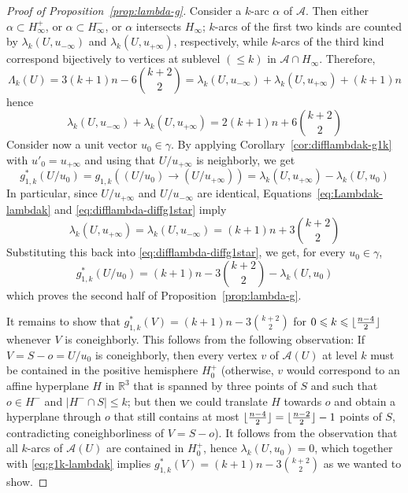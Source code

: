 \documentclass[a4paper,USenglish,cleveref, autoref, thm-restate,nolineno]{socg-lipics-v2021}
\renewcommand{\leq}{\leqslant}
\newcommand{\R}{\mathbb{R}}
\DeclarePairedDelimiter\floor{\lfloor}{\rfloor}
\begin{document}
\begin{proof}[Proof of Proposition~\ref{prop:lambda-g}]
Consider a $k$-arc $\alpha$ of $\mathcal{A}$. Then either $\alpha \subset H^+_{\infty}$, or $\alpha \subset H^-_{\infty}$, or $\alpha$ intersects $H_\infty$; $k$-arcs of the first two kinds are counted by $\lambda_k(U,u_{-\infty})$ and $\lambda_k(U,u_{+\infty})$, respectively, while $k$-arcs of the third kind correspond bijectively to vertices at sublevel $(\leq k)$ in $\mathcal{A}\cap H_{\infty}$. Therefore,
\[
\Lambda_k(U)=3(k+1)n-6\binom{k+2}{2}=\lambda_k(U,u_{-\infty}) + \lambda_k(U,u_{+\infty}) +(k+1)n
\]
hence
\begin{equation}
\label{eq:Lambdak-lambdak}
\lambda_k(U,u_{-\infty}) + \lambda_k(U,u_{+\infty}) = 2(k+1)n + 6\binom{k+2}{2}
\end{equation}
Consider now a unit vector $u_0 \in \gamma$. By applying Corollary~\ref{cor:difflambdak-g1k} with $u'_0 =u_{+\infty}$ and using that $U/u_{+\infty}$ is neighborly, we get
\begin{equation}
\label{eq:difflambda-diffg1star}
g^*_{1,k}(U/u_0) = g_{1,k}((U/u_0) \to (U/u_{+\infty}))
= \lambda_k(U,u_{+\infty}) - \lambda_k(U,u_0)
\end{equation}
In particular, since $U/u_{+\infty}$ and $U/u_{-\infty}$ are identical, Equations~\eqref{eq:Lambdak-lambdak} and \eqref{eq:difflambda-diffg1star}  imply
\begin{equation}
\label{eq:lambdapminfty}
\lambda_k(U,u_{+\infty}) = \lambda_k(U,u_{-\infty}) = (k+1)n + 3\binom{k+2}{2}
\end{equation}
Substituting this back into \eqref{eq:difflambda-diffg1star}, we get, for every $u_0\in \gamma$,
\begin{equation}
\label{eq:g1k-lambdak}
g^*_{1,k}(U/u_0) = (k+1)n-3\binom{k+2}{2} - \lambda_k(U,u_0)
\end{equation}
which proves the second half of Proposition~\ref{prop:lambda-g}.

It remains to show that $g^*_{1,k}(V)= (k+1)n-3\binom{k+2}{2}$ for $0\leq k\leq \floor{\frac{n-4}{2}}$ whenever $V$ is coneighborly. This follows from the following observation: If  $V=S-o=U/u_0$ is coneighborly, then every vertex $v$ of $\mathcal{A}(U)$ at level $k$ must be contained in the positive hemisphere $H_0^+$ (otherwise, $v$ would correspond to an affine hyperplane $H$ in $\R^3$ that is spanned by three points of $S$ and such that $o\in H^-$ and $|H^-\cap S|\leq k$; but then we could translate $H$ towards $o$ and obtain a hyperplane through $o$ that still contains at most $\floor{\frac{n-4}{2}}= \floor{\frac{n-2}{2}}-1$ points of $S$, contradicting coneighborliness of $V=S-o$). It follows from the observation that all $k$-arcs of $\mathcal{A}(U)$ are contained in $H_0^+$, hence $\lambda_k(U,u_0)=0$, which together with \eqref{eq:g1k-lambdak} implies 
$g^*_{1,k}(V)= (k+1)n-3\binom{k+2}{2}$ as we wanted to show.
\end{proof}
\end{document}
